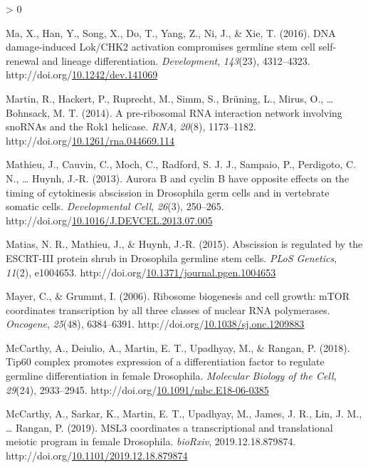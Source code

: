 \documentclass[12pt,oneside]{reedthesis}
\newlength{\cslhangindent}
\newenvironment{CSLReferences}[2] %
 {%
  \setlength{\parindent}{0pt}
  \ifodd #1 \everypar{\setlength{\hangindent}{\cslhangindent}}\ignorespaces\fi
  \ifnum #2 > 0
  \setlength{\parskip}{#2\baselineskip}
  \fi
 }%
 {}
\begin{document}
\begin{CSLReferences}{1}{0}
\leavevmode\hypertarget{ref-maDNADamageinducedLok2016}{}%
Ma, X., Han, Y., Song, X., Do, T., Yang, Z., Ni, J., \& Xie, T. (2016). {DNA} damage-induced {Lok}/{CHK2} activation compromises germline stem cell self-renewal and lineage differentiation. \emph{Development}, \emph{143}(23), 4312--4323. http://doi.org/\href{https://doi.org/10.1242/dev.141069}{10.1242/dev.141069}

\leavevmode\hypertarget{ref-martinPreribosomalRNAInteraction2014}{}%
Martin, R., Hackert, P., Ruprecht, M., Simm, S., Brüning, L., Mirus, O., \ldots{} Bohnsack, M. T. (2014). A pre-ribosomal {RNA} interaction network involving {snoRNAs} and the {Rok1} helicase. \emph{RNA}, \emph{20}(8), 1173--1182. http://doi.org/\href{https://doi.org/10.1261/rna.044669.114}{10.1261/rna.044669.114}

\leavevmode\hypertarget{ref-Mathieu2013d}{}%
Mathieu, J., Cauvin, C., Moch, C., Radford, S. J. J., Sampaio, P., Perdigoto, C. N., \ldots{} Huynh, J.-R. (2013). Aurora {B} and cyclin {B} have opposite effects on the timing of cytokinesis abscission in {Drosophila} germ cells and in vertebrate somatic cells. \emph{Developmental Cell}, \emph{26}(3), 250--265. http://doi.org/\href{https://doi.org/10.1016/J.DEVCEL.2013.07.005}{10.1016/J.DEVCEL.2013.07.005}

\leavevmode\hypertarget{ref-Matias2015g}{}%
Matias, N. R., Mathieu, J., \& Huynh, J.-R. (2015). Abscission is regulated by the {ESCRT-III} protein shrub in {Drosophila} germline stem cells. \emph{PLoS Genetics}, \emph{11}(2), e1004653. http://doi.org/\href{https://doi.org/10.1371/journal.pgen.1004653}{10.1371/journal.pgen.1004653}

\leavevmode\hypertarget{ref-Mayer2006a}{}%
Mayer, C., \& Grummt, I. (2006). Ribosome biogenesis and cell growth: {mTOR} coordinates transcription by all three classes of nuclear {RNA} polymerases. \emph{Oncogene}, \emph{25}(48), 6384--6391. http://doi.org/\href{https://doi.org/10.1038/sj.onc.1209883}{10.1038/sj.onc.1209883}

\leavevmode\hypertarget{ref-McCarthy2018h}{}%
McCarthy, A., Deiulio, A., Martin, E. T., Upadhyay, M., \& Rangan, P. (2018). Tip60 complex promotes expression of a differentiation factor to regulate germline differentiation in female {Drosophila}. \emph{Molecular Biology of the Cell}, \emph{29}(24), 2933--2945. http://doi.org/\href{https://doi.org/10.1091/mbc.E18-06-0385}{10.1091/mbc.E18-06-0385}

\leavevmode\hypertarget{ref-mccarthyMSL3CoordinatesTranscriptional2019}{}%
McCarthy, A., Sarkar, K., Martin, E. T., Upadhyay, M., James, J. R., Lin, J. M., \ldots{} Rangan, P. (2019). {MSL3} coordinates a transcriptional and translational meiotic program in female {Drosophila}. \emph{bioRxiv}, 2019.12.18.879874. http://doi.org/\href{https://doi.org/10.1101/2019.12.18.879874}{10.1101/2019.12.18.879874}


\end{CSLReferences}
\end{document}
